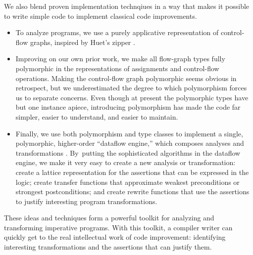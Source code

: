 \documentclass[blockstyle,preprint,nocopyrightspace]{sigplanconf}
\let\cite\citep
\newcommand\secref[1]{Section~\ref{sec:#1}}
\begin{document}
We also blend proven implementation technqiues
in a way that
makes it possible to
write simple code
to implement classical code improvements.
\begin{itemize}
\item
To {analyze} programs, we use a purely applicative representation of
control-flow graphs, inspired by Huet's zipper
\cite{huet:zipper,ramsey-dias:applicative-flow-graph}. 
%
%
\item
Improving on our own prior work, we make all flow-graph
types fully polymorphic in the representations of
assignments and control-flow operations.
%
Making the control-flow graph polymorphic seems obvious in retrospect,
but we underestimated the degree to which polymorphism forces us to
separate concerns.
Even though at present the polymorphic types have but one instance
apiece, introducing polymorphism has made the code far simpler, easier
to understand, and easier to maintain.
%
%
\item
Finally, we use both polymorphism and type classes to implement a single,
polymorphic,
higher-order ``dataflow engine,'' which composes analyses and transformations
\cite{lerner-grove-chambers:2002}. 
By~putting the sophisticated algorithms in the dataflow engine, 
we make it very easy to create a new analysis or transformation:
create a lattice representation for the assertions that can be
expressed in the logic;
create transfer functions that approximate weakest preconditions or
strongest postconditions;
and 
create rewrite functions that use the assertions to justify
interesting program transformations.
\end{itemize}
These ideas and techniques form a powerful toolkit for
analyzing and transforming imperative programs.
With this toolkit, a compiler writer can quickly get to the real
intellectual work of code improvement: identifying interesting
transformations and the assertions that can justify them.
\end{document}

